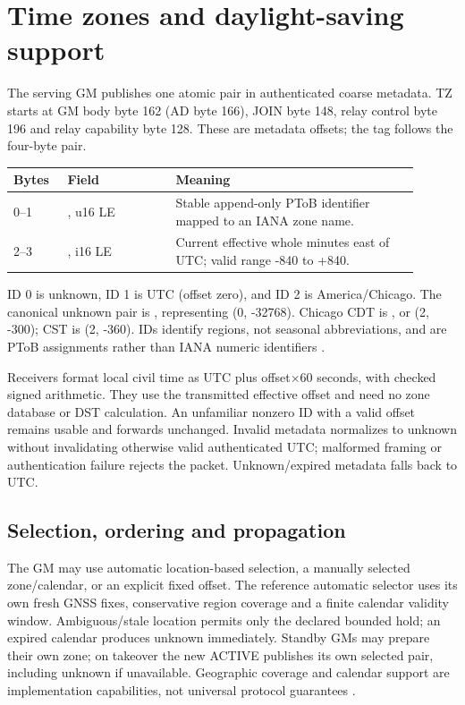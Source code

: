 \documentclass[11pt,letterpaper]{article}
\begin{document}
\section{Time zones and daylight-saving support}
The serving GM publishes one atomic pair in authenticated coarse metadata. TZ starts at GM body byte 162 (AD byte 166), JOIN byte 148, relay control byte 196 and relay capability byte 128. These are metadata offsets; the tag follows the four-byte pair.
\begin{center}\small
\begin{tabular}{@{}L{0.12\linewidth}L{0.24\linewidth}L{0.54\linewidth}@{}}\toprule
Bytes & Field & Meaning\\--1 & , u16 LE & Stable append-only PToB identifier mapped to an IANA zone name.\\
2--3 & , i16 LE & Current effective whole minutes east of UTC; valid range -840 to +840.\\
\bottomrule\end{tabular}\end{center}
ID 0 is unknown, ID 1 is UTC (offset zero), and ID 2 is America/Chicago. The canonical unknown pair is , representing (0, -32768). Chicago CDT is , or (2, -300); CST is (2, -360). IDs identify regions, not seasonal abbreviations, and are PToB assignments rather than IANA numeric identifiers \cite{tz,zones}.

Receivers format local civil time as UTC plus offset$\times60$ seconds, with checked signed arithmetic. They use the transmitted effective offset and need no zone database or DST calculation. An unfamiliar nonzero ID with a valid offset remains usable and forwards unchanged. Invalid metadata normalizes to unknown without invalidating otherwise valid authenticated UTC; malformed framing or authentication failure rejects the packet. Unknown/expired metadata falls back to UTC.

\subsection*{Selection, ordering and propagation}
The GM may use automatic location-based selection, a manually selected zone/calendar, or an explicit fixed offset. The reference automatic selector uses its own fresh GNSS fixes, conservative region coverage and a finite calendar validity window. Ambiguous/stale location permits only the declared bounded hold; an expired calendar produces unknown immediately. Standby GMs may prepare their own zone; on takeover the new ACTIVE publishes its own selected pair, including unknown if unavailable. Geographic coverage and calendar support are implementation capabilities, not universal protocol guarantees \cite{auto}.
\end{document}
